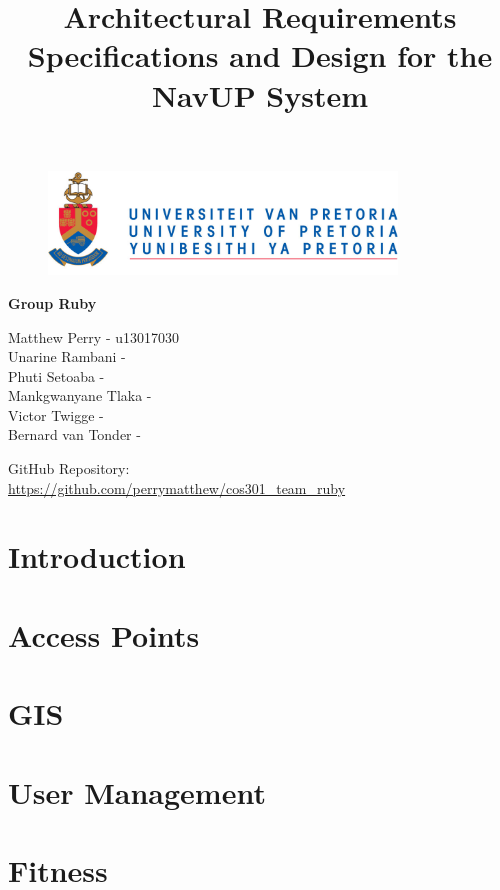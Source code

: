 \documentclass{article}
\begin{document}
		\begin{figure}[t]
			\centering
			\includegraphics[width=350px]{UP_Logo.PNG}
		\end{figure}
				\title{Architectural Requirements Specifications and Design for the NavUP System}
\maketitle
		\begin{center}
			\textbf{\newline Group Ruby} \\
		\end{center}
			
				
		\begin{flushright} \large
			Matthew Perry - u13017030 \\
			Unarine Rambani -  \\
			Phuti Setoaba -  \\
			Mankgwanyane Tlaka -  \\
			Victor Twigge -  \\
			Bernard van Tonder -  \\
		\end{flushright}
		
		
		
		
		GitHub Repository: \href{https://github.com/perrymatthew/cos301_team_ruby}\\
		\url{https://github.com/perrymatthew/cos301_team_ruby}
	

\clearpage
\tableofcontents

\clearpage
\section{Introduction}


\clearpage
\section{Access Points}


\clearpage
\section{GIS}


\clearpage
\section{User Management}


\clearpage
\section{Fitness}
\end{document}
